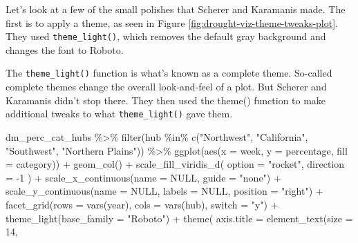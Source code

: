 \documentclass[
]{book}
\newenvironment{Shaded}{\begin{snugshade}}{\end{snugshade}}
\newcommand{\AttributeTok}[1]{\textcolor[rgb]{0.77,0.63,0.00}{#1}}
\newcommand{\ConstantTok}[1]{\textcolor[rgb]{0.00,0.00,0.00}{#1}}
\newcommand{\DecValTok}[1]{\textcolor[rgb]{0.00,0.00,0.81}{#1}}
\newcommand{\FunctionTok}[1]{\textcolor[rgb]{0.00,0.00,0.00}{#1}}
\newcommand{\NormalTok}[1]{#1}
\newcommand{\SpecialCharTok}[1]{\textcolor[rgb]{0.00,0.00,0.00}{#1}}
\newcommand{\StringTok}[1]{\textcolor[rgb]{0.31,0.60,0.02}{#1}}
\begin{document}
Let's look at a few of the small polishes that Scherer and Karamanis made. The first is to apply a theme, as seen in Figure \ref{fig:drought-viz-theme-tweaks-plot}. They used \texttt{theme\_light()}, which removes the default gray background and changes the font to Roboto.

The \texttt{theme\_light()} function is what's known as a complete theme. So-called complete themes change the overall look-and-feel of a plot. But Scherer and Karamanis didn't stop there. They then used the theme() function to make additional tweaks to what \texttt{theme\_light()} gave them.

\begin{Shaded}
\begin{Highlighting}[]
\NormalTok{dm\_perc\_cat\_hubs }\SpecialCharTok{\%\textgreater{}\%}
  \FunctionTok{filter}\NormalTok{(hub }\SpecialCharTok{\%in\%} \FunctionTok{c}\NormalTok{(}\StringTok{"Northwest"}\NormalTok{, }
                    \StringTok{"California"}\NormalTok{, }
                    \StringTok{"Southwest"}\NormalTok{, }
                    \StringTok{"Northern Plains"}\NormalTok{)) }\SpecialCharTok{\%\textgreater{}\%}
  \FunctionTok{ggplot}\NormalTok{(}\FunctionTok{aes}\NormalTok{(}\AttributeTok{x =}\NormalTok{ week, }
             \AttributeTok{y =}\NormalTok{ percentage,}
             \AttributeTok{fill =}\NormalTok{ category)) }\SpecialCharTok{+}
  \FunctionTok{geom\_col}\NormalTok{() }\SpecialCharTok{+}
  \FunctionTok{scale\_fill\_viridis\_d}\NormalTok{(}
    \AttributeTok{option =} \StringTok{"rocket"}\NormalTok{,}
    \AttributeTok{direction =} \SpecialCharTok{{-}}\DecValTok{1}
\NormalTok{  ) }\SpecialCharTok{+}
  \FunctionTok{scale\_x\_continuous}\NormalTok{(}\AttributeTok{name =} \ConstantTok{NULL}\NormalTok{, }
                     \AttributeTok{guide =} \StringTok{"none"}\NormalTok{) }\SpecialCharTok{+}
  \FunctionTok{scale\_y\_continuous}\NormalTok{(}\AttributeTok{name =} \ConstantTok{NULL}\NormalTok{, }
                     \AttributeTok{labels =} \ConstantTok{NULL}\NormalTok{, }
                     \AttributeTok{position =} \StringTok{"right"}\NormalTok{) }\SpecialCharTok{+}
  \FunctionTok{facet\_grid}\NormalTok{(}\AttributeTok{rows =} \FunctionTok{vars}\NormalTok{(year), }
             \AttributeTok{cols =} \FunctionTok{vars}\NormalTok{(hub), }
             \AttributeTok{switch =} \StringTok{"y"}\NormalTok{) }\SpecialCharTok{+}
  \FunctionTok{theme\_light}\NormalTok{(}\AttributeTok{base\_family =} \StringTok{"Roboto"}\NormalTok{) }\SpecialCharTok{+}
  \FunctionTok{theme}\NormalTok{(}
    \AttributeTok{axis.title =} \FunctionTok{element\_text}\NormalTok{(}\AttributeTok{size =} \DecValTok{14}\NormalTok{, }

\end{Highlighting}
\end{Shaded}
\end{document}
